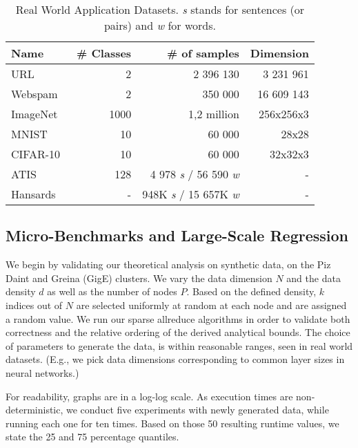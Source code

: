 \documentclass[11pt]{article}
\begin{document}
\begin{table}[b]
	\centering
	\begin{tabular}{ @{} l | r | r | r @{} }
		\toprule
		Name & \# Classes & \# of samples & Dimension \\
		\midrule 
		URL~\cite{ma2009identifying} & 2 & 2 396 130 & 3 231 961 \\
		Webspam~\cite{webb2006introducing} & 2 &  350 000 & 16 609 143 \\
		\midrule 
		ImageNet~\cite{russakovsky2015imagenet} & 1000 & 1,2 million & 256x256x3\\
		MNIST~\cite{lecun2010mnisthandwrittendigit} & 10 & 60 000 & 28x28 \\
		CIFAR-10~\cite{krizhevsky2009learning} & 10 & 60 000 & 32x32x3 \\
		\midrule
		ATIS~\cite{hemphill1990atis} & 128 & 4 978 \textit{s} / 56 590 \textit{w} & - \\
		\midrule
		Hansards~\cite{hansards} & - & 948K \textit{s} / 15 657K \textit{w} & - \\
		\bottomrule
	\end{tabular}
	\caption{Real World Application Datasets. \textit{s} stands for sentences (or pairs) and \textit{w} for words. }
	\label{tbl:DataSets}
\end{table}

\subsection{Micro-Benchmarks and Large-Scale Regression}

We begin by validating our theoretical analysis on synthetic data, on the Piz Daint and Greina (GigE) clusters. 
We vary the data dimension $N$ and the data density $d$ as well as the number of nodes $P$. 
Based on the defined density, $k$ indices out of $N$ are selected uniformly at random at each node and are assigned a random value. 
We run our sparse allreduce algorithms in order to validate both correctness and the relative ordering of the derived analytical bounds. 
The choice of parameters to generate the data, is within reasonable ranges, seen in real world datasets. 
(E.g., we pick data dimensions corresponding to common layer sizes in neural networks.) 

For readability, graphs are in a log-log scale. 
As execution times are non-deterministic, we conduct five experiments with newly generated data, while running each one for ten times. 
Based on those 50 resulting runtime values, we state the 25 and 75 percentage quantiles.
\end{document}
